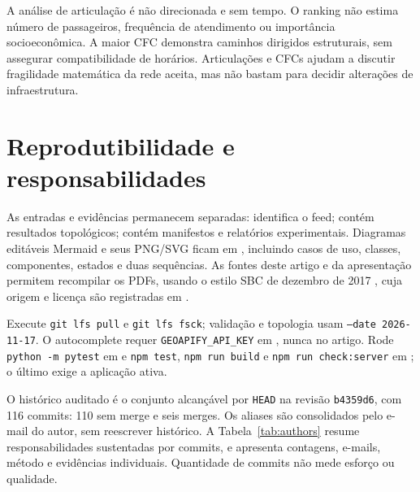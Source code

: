 \documentclass[12pt]{article}
\newcommand{\code}[1]{\texttt{#1}}
\begin{document}
A análise de articulação é não direcionada e sem tempo. O ranking não estima número de passageiros, frequência de atendimento ou importância socioeconômica. A maior CFC demonstra caminhos dirigidos estruturais, sem assegurar compatibilidade de horários. Articulações e CFCs ajudam a discutir fragilidade matemática da rede aceita, mas não bastam para decidir alterações de infraestrutura.

\section{Reprodutibilidade e responsabilidades}
As entradas e evidências permanecem separadas:  identifica o feed;  contém resultados topológicos;  contém manifestos e relatórios experimentais. Diagramas editáveis Mermaid e seus PNG/SVG ficam em , incluindo casos de uso, classes, componentes, estados e duas sequências. As fontes deste artigo e da apresentação permitem recompilar os PDFs, usando o estilo SBC de dezembro de 2017 \cite{sbc}, cuja origem e licença são registradas em .

Execute \code{git lfs pull} e \code{git lfs fsck}; validação e topologia usam \code{--date 2026-11-17}. O autocomplete requer \code{GEOAPIFY\_API\_KEY} em , nunca no artigo. Rode \code{python -m pytest} em  e \code{npm test}, \code{npm run build} e \code{npm run check:server} em ; o último exige a aplicação ativa.

O histórico auditado é o conjunto alcançável por \code{HEAD} na revisão \code{b4359d6}, com 116 commits: 110 sem merge e seis merges. Os aliases são consolidados pelo e-mail do autor, sem reescrever histórico. A Tabela~\ref{tab:authors} resume responsabilidades sustentadas por commits, e  apresenta contagens, e-mails, método e evidências individuais. Quantidade de commits não mede esforço ou qualidade.
\end{document}

